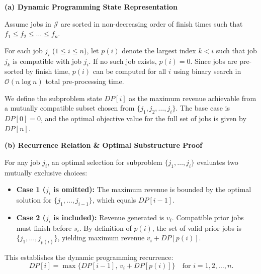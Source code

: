 \documentclass[11pt, a4paper]{article}
\newcommand{\Onotation}[1]{\mathcal{O}\left(#1\right)}
\newcommand{\solsection}[1]{\vspace{2pt}\noindent\textbf{\textcolor{primary}{#1}}\par\vspace{1pt}}
\begin{document}
\vspace{2pt}

\begin{solutionbox}
  \solsection{(a) Dynamic Programming State Representation}
  Assume jobs in $\mathcal{J}$ are sorted in non-decreasing order of finish times such that $f_1 \le f_2 \le \dots \le f_n$. 

  For each job $j_i$ ($1 \le i \le n$), let $p(i)$ denote the largest index $k < i$ such that job $j_k$ is compatible with job $j_i$. If no such job exists, $p(i) = 0$. Since jobs are pre-sorted by finish time, $p(i)$ can be computed for all $i$ using binary search in $\Onotation{n \log n}$ total pre-processing time.

  We define the subproblem state $DP[i]$ as the maximum revenue achievable from a mutually compatible subset chosen from $\{j_1, j_2, \dots, j_i\}$. The base case is $DP[0] = 0$, and the optimal objective value for the full set of jobs is given by $DP[n]$.

  \solsection{(b) Recurrence Relation \& Optimal Substructure Proof}
  For any job $j_i$, an optimal selection for subproblem $\{j_1, \dots, j_i\}$ evaluates two mutually exclusive choices:
  \begin{itemize}[leftmargin=1.4em, itemsep=0.5pt]
    \item \textbf{Case 1 ($j_i$ is omitted):} The maximum revenue is bounded by the optimal solution for $\{j_1, \dots, j_{i-1}\}$, which equals $DP[i-1]$.
    \item \textbf{Case 2 ($j_i$ is included):} Revenue generated is $v_i$. Compatible prior jobs must finish before $s_i$. By definition of $p(i)$, the set of valid prior jobs is $\{j_1, \dots, j_{p(i)}\}$, yielding maximum revenue $v_i + DP[p(i)]$.
  \end{itemize}
  This establishes the dynamic programming recurrence:
  \begin{equation}
    DP[i] = \max \Big\{ DP[i-1],\, v_i + DP[p(i)] \Big\} \quad \text{for } i = 1, 2, \dots, n.
  \end{equation}


\end{solutionbox}
\end{document}
